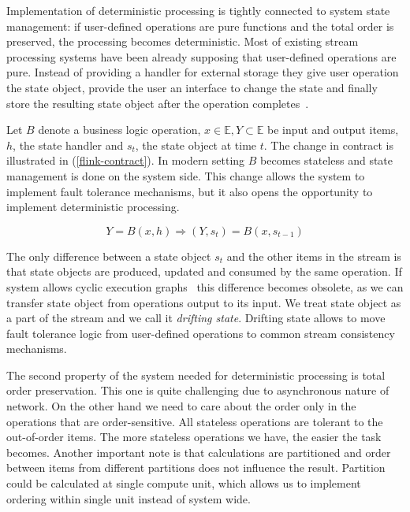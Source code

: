 
\label{motivation-section}

Implementation of deterministic processing is tightly connected to system state management: if user-defined operations are pure functions and the total order is preserved, the processing becomes deterministic. Most of existing stream processing systems have been already supposing that user-defined operations are pure. Instead of providing a handler for external storage they give user operation the state object, provide the user an interface to change the state and finally store the resulting state object after the operation completes~\cite{carbone2015apache, apache:storm, Noghabi:2017:SSS:3137765.3137770}.

Let $B$ denote a business logic operation, $x \in \mathbb{E}, Y \subset \mathbb{E}$ be input and output items, $h$, the state handler and $s_t$, the state object at time $t$. The change in contract is illustrated in (\ref{flink-contract}). In modern setting $B$ becomes stateless and state management is done on the system side. This change allows the system to implement fault tolerance mechanisms, but it also opens the opportunity to implement deterministic processing.

\begin{equation}
\label{flink-contract}
Y = B(x, h) \Rightarrow (Y, s_t) = B(x, s_{t-1}) 
\end{equation}

The only difference between a state object $s_t$ and the other items in the stream is that state objects are produced, updated and consumed by the same operation. If system allows cyclic execution graphs~\cite{Murray:2013:NTD:2517349.2522738} this difference becomes obsolete, as we can transfer state object from operations output to its input. We treat state object as a part of the stream and we call it {\it drifting state}. Drifting state allows to move fault tolerance logic from user-defined operations to common stream consistency mechanisms.

The second property of the system needed for deterministic processing is total order preservation. This one is quite challenging due to asynchronous nature of network. On the other hand we need to care about the order only in the operations that are order-sensitive. All stateless operations are tolerant to the out-of-order items. The more stateless operations we have, the easier the task becomes. Another important note is that calculations are partitioned and order between items from different partitions does not influence the result. Partition could be calculated at single compute unit, which allows us to implement ordering within single unit instead of system wide.

